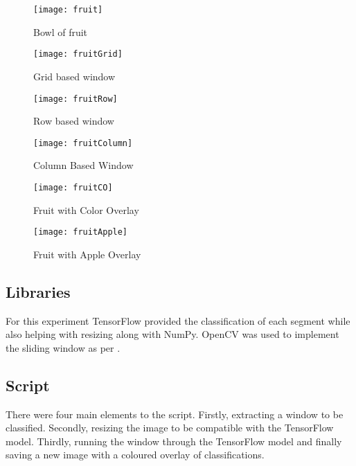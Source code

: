 \begin{figure}[h] 
  \label{fruitBowlManipulations} 
  \begin{minipage}[b]{0.5\linewidth}
    \centering
    \texttt{[image: fruit]}
    \caption{Bowl of fruit \parencite{fruitBowl}}
    \label{fig:fruit}
    \vspace{4ex}
  \end{minipage}%
  \begin{minipage}[b]{0.5\linewidth}
    \centering
    \texttt{[image: fruitGrid]}
	\caption{Grid based window}
    \label{fig:fruitGrid}
    \vspace{4ex}
  \end{minipage} 
  \begin{minipage}[b]{0.5\linewidth}
    \centering
    \texttt{[image: fruitRow]}
    \caption{Row based window}
    \label{fig:fruitRow}
    \vspace{4ex}
  \end{minipage}%
  \begin{minipage}[b]{0.5\linewidth}
    \centering
    \texttt{[image: fruitColumn]}
    \caption{Column Based Window}
    \label{fig:fruitColumn}
    \vspace{4ex}
  \end{minipage}
  \begin{minipage}[b]{0.5\linewidth}
    \centering
    \texttt{[image: fruitCO]}
    \caption{Fruit with Color Overlay}
    \label{fig:fruitOverlay}
    \vspace{4ex}
  \end{minipage}%
  \begin{minipage}[b]{0.5\linewidth}
    \centering
    \texttt{[image: fruitApple]}
    \caption{Fruit with Apple Overlay}
    \label{fig:fruitApple}
    \vspace{4ex}
  \end{minipage}
\end{figure}
\afterpage{\clearpage}

\tocless\subsection{Libraries}
For this experiment TensorFlow provided the classification of each segment while
also helping with resizing along with NumPy. OpenCV was used to implement the
sliding window as per \parencite{slidingWindowTut}.

\tocless\subsection{Script}
There were four main elements to the script. Firstly, extracting a window to be
classified. Secondly, resizing the image to be compatible with the TensorFlow model. Thirdly, running the window through the TensorFlow model and finally
saving a new image with a coloured overlay of classifications.

